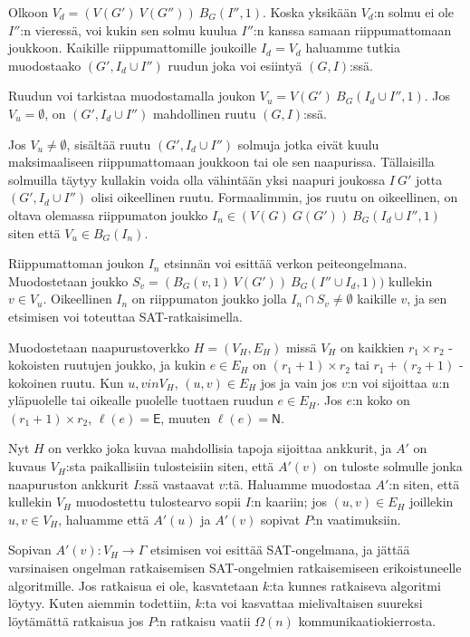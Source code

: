 \documentclass[12pt,finnish]{tktltiki2}
\theoremstyle{definition}
\theoremstyle{remark}
\begin{document}
Olkoon $V_d = (V(G') \ V(G'')) \ B_G(I'', 1)$. Koska yksikään $V_d$:n solmu ei ole $I''$:n vieressä, voi kukin sen solmu kuulua $I''$:n kanssa samaan riippumattomaan joukkoon. Kaikille riippumattomille joukoille $I_d = V_d$ haluamme tutkia muodostaako $(G', I_d \cup I'')$ ruudun joka voi esiintyä $(G, I)$:ssä.

Ruudun voi tarkistaa muodostamalla joukon $V_u = V(G') \ B_G(I_d \cup I'', 1)$. Jos $V_u = \emptyset$, on $(G', I_d \cup I'')$ mahdollinen ruutu $(G, I)$:ssä.

Jos $V_u \neq \emptyset$, sisältää ruutu $(G', I_d \cup I'')$ solmuja jotka eivät kuulu maksimaaliseen riippumattomaan joukkoon tai ole sen naapurissa. Tällaisilla solmuilla täytyy kullakin voida olla vähintään yksi naapuri joukossa $I \ G'$ jotta $(G', I_d \cup I'')$ olisi oikeellinen ruutu. Formaalimmin, jos ruutu on oikeellinen, on oltava olemassa riippumaton joukko $I_n \in (V(G) \ G(G')) \ B_G(I_d \cup I'', 1)$ siten että $V_u \in B_G(I_n)$.

Riippumattoman joukon $I_n$ etsinnän voi esittää verkon peiteongelmana. Muodostetaan joukko $S_v = (B_G(v, 1) \ V(G')) \ B_G(I'' \cup I_d, 1))$ kullekin $v \in V_u$. Oikeellinen $I_n$ on riippumaton joukko jolla $I_n \cap S_v \neq \emptyset$ kaikille $v$, ja sen etsimisen voi toteuttaa SAT-ratkaisimella.

Muodostetaan naapurustoverkko $H = (V_H, E_H)$ missä $V_H$ on kaikkien $r_1 \times r_2$ -kokoisten ruutujen joukko, ja kukin $e \in E_H$ on $(r_1 + 1) \times r_2$ tai $r_1 + (r_2 + 1)$ -kokoinen ruutu. Kun $u, v in V_H$, $(u, v) \in E_H$ jos ja vain jos $v$:n voi sijoittaa $u$:n yläpuolelle tai oikealle puolelle tuottaen ruudun $e \in E_H$. Jos $e$:n koko on $(r_1 + 1) \times r_2$, $\ell(e) = \mathsf{E}$, muuten $\ell(e) = \mathsf{N}$. 

Nyt $H$ on verkko joka kuvaa mahdollisia tapoja sijoittaa ankkurit, ja $A'$ on kuvaus $V_H$:sta paikallisiin tulosteisiin siten, että $A'(v)$ on tuloste solmulle jonka naapuruston ankkurit $I$:ssä vastaavat $v$:tä. Haluamme muodostaa $A'$:n siten, että kullekin $V_H$ muodostettu tulostearvo sopii $I$:n kaariin; jos $(u, v) \in E_H$ joillekin $u, v \in V_H$, haluamme että $A'(u)$ ja $A'(v)$ sopivat $P$:n vaatimuksiin.

Sopivan $A'(v): V_H \rightarrow \Gamma$ etsimisen voi esittää SAT-ongelmana, ja jättää varsinaisen ongelman ratkaisemisen SAT-ongelmien ratkaisemiseen erikoistuneelle algoritmille. Jos ratkaisua ei ole, kasvatetaan $k$:ta kunnes ratkaiseva algoritmi löytyy. Kuten aiemmin todettiin, $k$:ta voi kasvattaa mielivaltaisen suureksi löytämättä ratkaisua jos $P$:n ratkaisu vaatii $\Omega(n)$ kommunikaatiokierrosta.
\end{document}
